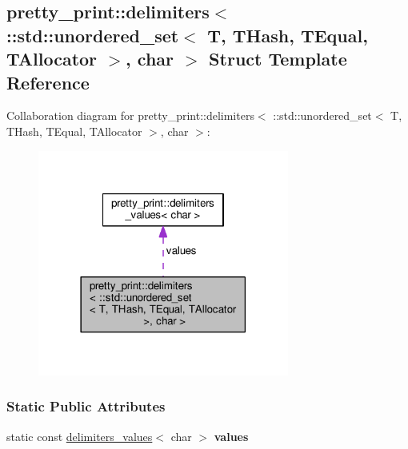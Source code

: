 \hypertarget{structpretty__print_1_1delimiters_3_01_1_1std_1_1unordered__set_3_01T_00_01THash_00_01TEqual_00_9d58038da02264e434f8b08cedf60f18}{}\subsection{pretty\+\_\+print\+:\+:delimiters$<$ \+:\+:std\+:\+:unordered\+\_\+set$<$ T, T\+Hash, T\+Equal, T\+Allocator $>$, char $>$ Struct Template Reference}
\label{structpretty__print_1_1delimiters_3_01_1_1std_1_1unordered__set_3_01T_00_01THash_00_01TEqual_00_9d58038da02264e434f8b08cedf60f18}


Collaboration diagram for pretty\+\_\+print\+:\+:delimiters$<$ \+:\+:std\+:\+:unordered\+\_\+set$<$ T, T\+Hash, T\+Equal, T\+Allocator $>$, char $>$\+:
\nopagebreak
\begin{figure}[H]
\begin{center}
\leavevmode
\includegraphics[width=234pt]{structpretty__print_1_1delimiters_3_01_1_1std_1_1unordered__set_3_01T_00_01THash_00_01TEqual_00_d17653090a9f1dfc361653e01ec6112d}
\end{center}
\end{figure}
\subsubsection*{Static Public Attributes}
\begin{DoxyCompactItemize}
\item 
static const \hyperlink{structpretty__print_1_1delimiters__values}{delimiters\+\_\+values}$<$ char $>$ {\bfseries values}\hypertarget{structpretty__print_1_1delimiters_3_01_1_1std_1_1unordered__set_3_01T_00_01THash_00_01TEqual_00_9d58038da02264e434f8b08cedf60f18_a370dbfd78c29f7cfdae8c7f505519eeb}{}\label{structpretty__print_1_1delimiters_3_01_1_1std_1_1unordered__set_3_01T_00_01THash_00_01TEqual_00_9d58038da02264e434f8b08cedf60f18_a370dbfd78c29f7cfdae8c7f505519eeb}

\end{DoxyCompactItemize}


